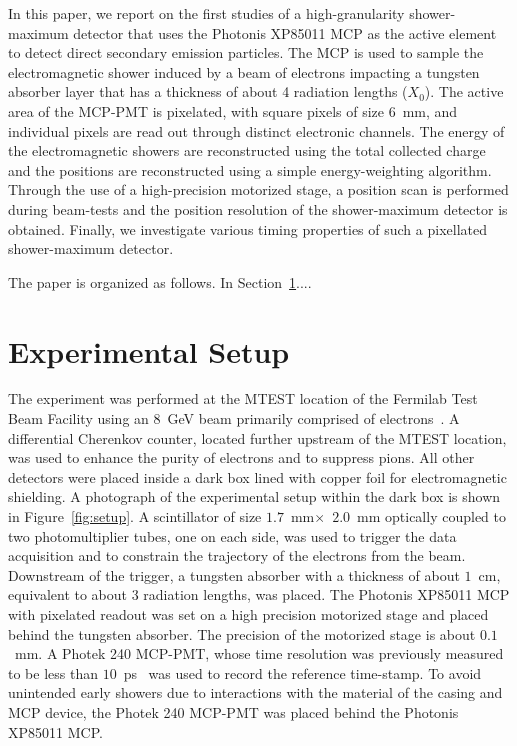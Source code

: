 \documentclass[12pt]{article}
\begin{document}
{In this paper, we report on the first studies of a high-granularity
shower-maximum detector that uses the Photonis XP85011 MCP as the active
element to detect direct secondary emission particles. The MCP is used to
sample the electromagnetic shower induced by a beam of electrons impacting a
tungsten absorber layer that has a thickness of about 4 radiation lengths
($X_{0}$). The active area of the MCP-PMT is pixelated, with square pixels of
size $6$~mm, and individual pixels are read out through distinct electronic
channels. The energy of the electromagnetic showers are reconstructed using the
total collected charge and the positions are reconstructed using a simple
energy-weighting algorithm. Through the use of a high-precision motorized stage,
a position scan is performed during beam-tests and the position resolution of
the shower-maximum detector is obtained. Finally, we investigate various timing
properties of such a pixellated shower-maximum detector.

The paper is organized as follows. In Section~\ref{}....





\section{Experimental Setup}

The experiment was performed at the MTEST location of the Fermilab Test Beam
Facility using an $8$~GeV beam primarily comprised of electrons~\cite{FTBF}. A
differential Cherenkov counter, located further upstream of the MTEST location,
was used to enhance the purity of electrons and to suppress pions. All other
detectors were placed inside a dark box lined with copper foil for
electromagnetic shielding. A photograph of the experimental setup within the
dark box is shown in Figure~\ref{fig:setup}. A scintillator of size
$1.7$~mm$\times$~$2.0$~mm optically coupled to two photomultiplier tubes, one on
each side, was used to trigger the data acquisition and to constrain the
trajectory of the electrons from the beam. Downstream of the trigger, a tungsten
absorber with a thickness of about $1$~cm, equivalent to about 3 radiation
lengths, was placed. The Photonis XP85011 MCP with pixelated readout was set on
a high precision motorized stage and placed behind the tungsten absorber. The
precision of the motorized stage is about $0.1$~mm. A Photek 240 MCP-PMT, whose
time resolution was previously measured to be less than
$10$~ps~\cite{MCPShowerMaxPaper} was used to record the reference time-stamp. To
avoid unintended early showers due to interactions with the material of the
casing and MCP device, the Photek 240 MCP-PMT was placed behind the Photonis
XP85011 MCP.



}
\end{document}
